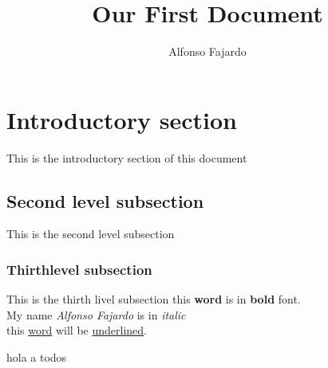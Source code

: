 \documentclass{article}
\title{Our First Document}
\author{Alfonso Fajardo}
\date{}
\begin{document}
\maketitle %
\section{Introductory section} %
This is the introductory section of this document
\subsection{Second level subsection} %
This is the second level subsection
\subsubsection{Thirthlevel subsection}
This is the thirth livel subsection
this \textbf{word} is in \textbf{bold} font. \\
My name \emph{Alfonso Fajardo} is in \emph{italic} \\
this \underline{word} will be \underline{underlined}.

\noindent hola a todos %
\end{document}
